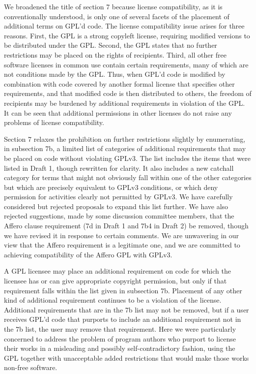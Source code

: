 We broadened the title of section 7 because license compatibility, as it is
conventionally understood, is only one of several facets of the placement of
additional terms on GPL'd code.  The license compatibility issue arises for
three reasons.  First, the GPL is a strong copyleft license, requiring
modified versions to be distributed under the GPL.  Second, the GPL states
that no further restrictions may be placed on the rights of recipients.
Third, all other free software licenses in common use contain certain
requirements, many of which are not conditions made by the GPL.  Thus, when
GPL'd code is modified by combination with code covered by another formal
license that specifies other requirements, and that modified code is then
distributed to others, the freedom of recipients may be burdened by
additional requirements in violation of the GPL.  It can be seen that
additional permissions in other licenses do not raise any problems of license
compatibility.


Section 7 relaxes the prohibition on further restrictions slightly by
enumerating, in subsection 7b, a limited list of categories of additional
requirements that may be placed on code without violating GPLv3.  The list
includes the items that were listed in Draft 1, though rewritten for clarity.
It also includes a new catchall category for terms that might not obviously
fall within one of the other categories but which are precisely equivalent to
GPLv3 conditions, or which deny permission for activities clearly not
permitted by GPLv3.  We have carefully considered but rejected proposals to
expand this list further.  We have also rejected suggestions, made by some
discussion committee members, that the Affero clause requirement (7d in Draft
1 and 7b4 in Draft 2) be removed, though we have revised it in response to
certain comments.  We are unwavering in our view that the Affero requirement
is a legitimate one, and we are committed to achieving compatibility of the
Affero GPL with GPLv3.


A GPL licensee may place an additional requirement on code for which the
licensee has or can give appropriate copyright permission, but only if that
requirement falls within the list given in subsection 7b.  Placement of any
other kind of additional requirement continues to be a violation of the
license.  Additional requirements that are in the 7b list may not be removed,
but if a user receives GPL'd code that purports to include an additional
requirement not in the 7b list, the user may remove that requirement.  Here
we were particularly concerned to address the problem of program authors who
purport to license their works in a misleading and possibly
self-contradictory fashion, using the GPL together with unacceptable added
restrictions that would make those works non-free software.

